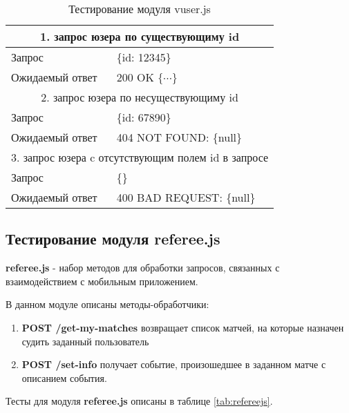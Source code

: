 \begin{table} 
\caption{\label{tab:vuserjs}Тестирование модуля vuser.js}
\begin{center}
\begin{tabular}{|l|p{10cm}|}
\hline
\multicolumn{2}{|c|}{1. запрос юзера по существующиму id} \\
\hline
Запрос & \{id: 12345\} \\
Ожидаемый ответ & 200 OK $\{\cdots\}$ \\
\hline
\multicolumn{2}{|c|}{2. запрос юзера по несуществующиму id} \\
\hline
Запрос & \{id: 67890\} \\
Ожидаемый ответ & 404 NOT FOUND: \{null\} \\
\hline
\multicolumn{2}{|c|}{3. запрос юзера c отсутствующим полем id в запросе} \\
\hline
Запрос & \{\} \\
Ожидаемый ответ & 400 BAD REQUEST: \{null\} \\
\hline
\end{tabular}
\end{center}
\end{table} 

\subsection{Тестирование модуля referee.js}
\label{subsec:referee-test}

\textbf{referee.js} - набор методов для обработки запросов, связанных с взаимодействием с мобильным приложением.

В данном модуле описаны методы-обработчики:
\begin{enumerate}
	\item \textbf{POST /get-my-matches} возвращает список матчей, на которые назначен судить заданный пользователь
	\item \textbf{POST /set-info} получает событие, произошедшее в заданном матче с описанием события.
\end{enumerate}

Тесты для модуля \textbf{referee.js} описаны в таблице \ref{tab:refereejs}.

